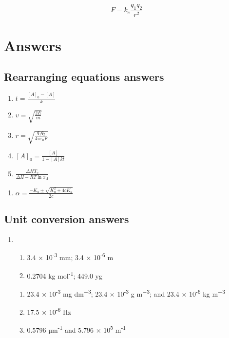 \documentclass[
]{book}
\providecommand{\tightlist}{%
  \setlength{\itemsep}{0pt}\setlength{\parskip}{0pt}}
\begin{document}
\begin{equation}
F = k_e \frac{q_1 q_2}{r^2}
\label{eq:coulomb}
\end{equation}

\hypertarget{sec:Answers}{%
\section{Answers}\label{sec:Answers}}

\hypertarget{subsec:rearrangeans}{%
\subsection{Rearranging equations answers}\label{subsec:rearrangeans}}

\begin{enumerate}
\def\labelenumi{\arabic{enumi}.}
\tightlist
\item
  \(t =\frac{[A]_0-[A]}{k}\)
\item
  \(v = \sqrt {\frac{2E}{m}}\)
\item
  \(r = \sqrt{\frac{q_1 q_2}{4 \pi \varepsilon_0 F }}\)
\item
  \([A]_0=\frac{[A]}{1-[A]kt}\)
\item
  \(\frac{\Delta H T_2}{\Delta H - R T \ln {x_A}}\)
\end{enumerate}

\begin{enumerate}
\def\labelenumi{\arabic{enumi}.}
\tightlist
\item
  \(\alpha = \frac{-K_a \pm \sqrt{K_a^2 + 4 c K_a}}{2c}\)
\end{enumerate}

\hypertarget{subsec:Unitconvans}{%
\subsection{Unit conversion answers}\label{subsec:Unitconvans}}

\begin{enumerate}
\def\labelenumi{\arabic{enumi}.}
\item
  \begin{enumerate}
  \def\labelenumii{\alph{enumii}.}
  \tightlist
  \item
    3.4 × 10\textsuperscript{-3} mm; 3.4 × 10\textsuperscript{-6} m
  \item
    0.2704 kg mol\textsuperscript{-1}; 449.0 yg
  \end{enumerate}

  \begin{enumerate}
  \def\labelenumii{\alph{enumii}.}
  \setcounter{enumii}{2}
  \tightlist
  \item
    23.4 × 10\textsuperscript{-3} mg dm\textsuperscript{−3}; 23.4 × 10\textsuperscript{-3} g m\textsuperscript{−3}; and 23.4 × 10\textsuperscript{-6} kg m\textsuperscript{−3}
  \item
    17.5 × 10\textsuperscript{-6} Hz
  \item
    0.5796 µm\textsuperscript{-1} and 5.796 × 10\textsuperscript{5} m\textsuperscript{-1}
  \end{enumerate}
\end{enumerate}
\end{document}

